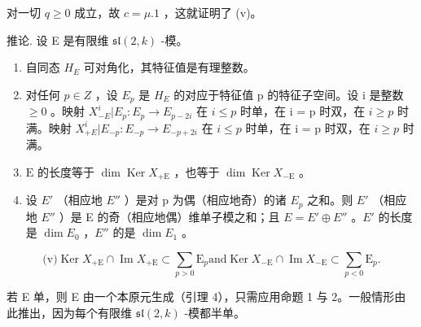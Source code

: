 对一切 \(q \geq 0\) 成立，故 \(c = \mu.1\) ，这就证明了 (v)。

推论. 设 E 是有限维 \(\mathfrak{sl}(2,k)\) -模。

\begin{enumerate}
\def\labelenumi{(\roman{enumi})}
\item
  自同态 \(H_{E}\) 可对角化，其特征值是有理整数。
\item
  对任何 \(p \in Z\) ，设 \(E_{p}\) 是 \(H_{E}\) 的对应于特征值 p 的特征子空间。设 i 是整数 \(\geq 0\) 。映射 \(X_{-E}^{i}|E_{p}:E_{p} \to E_{p-2i}\) 在 \(i \leq p\) 时单，在 i = p 时双，在 \(i \geq p\) 时满。映射 \(X_{+E}^{i}|E_{-p}:E_{-p} \to E_{-p+2i}\) 在 \(i \leq p\) 时单，在 i = p 时双，在 \(i \geq p\) 时满。
\item
  \(\mathrm{E}\) 的长度等于 \(\dim \operatorname{Ker} X_{+\mathrm{E}}\) ，也等于 \(\dim \operatorname{Ker} X_{-\mathrm{E}}\) 。
\item
  设 \(E'\) （相应地 \(E''\) ）是对 p 为偶（相应地奇）的诸 \(E_{p}\) 之和。则 \(E'\) （相应地 \(E''\) ）是 E 的奇（相应地偶）维单子模之和；且 \(E = E' \oplus E''\) 。\(E'\) 的长度是 \(\dim E_{0}\) ，\(E''\) 的是 \(\dim E_{1}\) 。
\end{enumerate}

\[
\text {(v)} \operatorname{Ker} X _ {+ \mathrm{E}} \cap \operatorname{Im} X _ {+ \mathrm{E}} \subset \sum_ {p > 0} \mathrm{E} _ {p} \text {and} \operatorname{Ker} X _ {- \mathrm{E}} \cap \operatorname{Im} X _ {- \mathrm{E}} \subset \sum_ {p <   0} \mathrm{E} _ {p}.
\]

若 E 单，则 E 由一个本原元生成（引理 4），只需应用命题 1 与 2。一般情形由此推出，因为每个有限维 \(\mathfrak{sl}(2,k)\) -模都半单。

